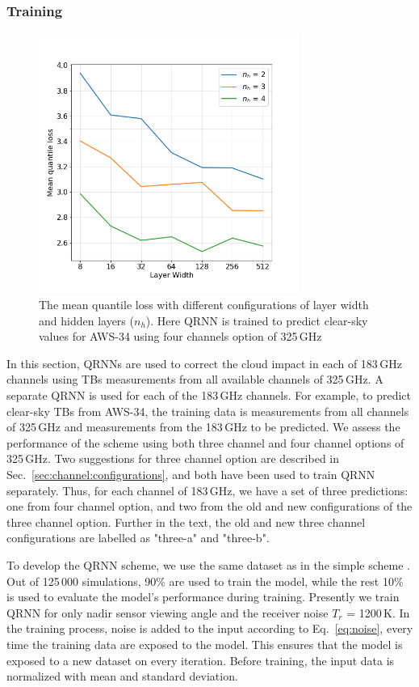 \documentclass[12pt]{article}
\begin{document}
\subsubsection{Training}
%  
\label{sec:qrnn:training}
\begin{figure}[!tb]
	\centering
	\includegraphics[height=85mm]{quantile_loss.png}
	\caption{The mean quantile loss with different configurations of layer width and hidden layers ($n_h$). Here QRNN is trained to predict clear-sky values for AWS-34 using four channels option of 325\,GHz}
	\label{fig:quantile_loss}
\end{figure}
In this section, QRNNs are used to correct the cloud impact in each of 183\,GHz
channels using TBs measurements from all available channels of 325\,GHz. A
separate QRNN is used for each of the 183\,GHz channels. For example, to
predict clear-sky TBs from AWS-34, the training data is measurements from all
channels of 325\,GHz and measurements from the 183\,GHz to be predicted. We
assess the performance of the scheme using both three channel and four channel
options of 325\,GHz. Two suggestions for three channel option are described in
Sec.~\ref{sec:channel:configurations}, and both have been used to train QRNN
separately. Thus, for each channel of 183\,GHz, we have a set of three
predictions: one from four channel option, and two from the old and new
configurations of the three channel option. Further in the text, the old and
new three channel configurations are labelled as "three-a" and "three-b".

To develop the QRNN scheme, we use the same dataset as in the
simple scheme . Out of 125\,000 simulations, 90\% are used to train the model,
while the rest 10\% is used to evaluate the model's performance during
training. Presently we train QRNN for only nadir sensor viewing angle and the
receiver noise $T_r$ = 1200\,K. In the training process, noise is added to the
input according to Eq.~\ref{eq:noise}, every time the training data are exposed
to the model. This ensures that the model is exposed to a new dataset on every
iteration. Before training, the input data is normalized with mean and standard
deviation.
\end{document}
